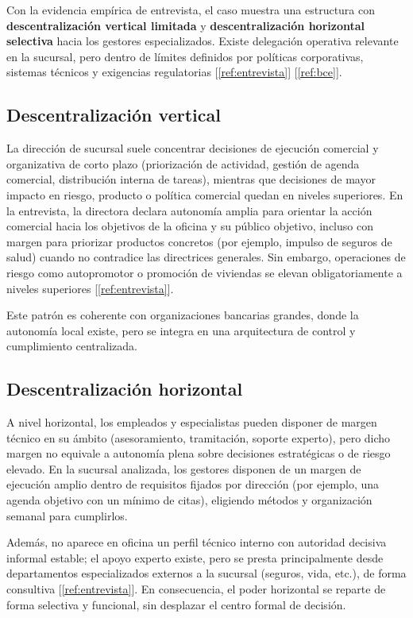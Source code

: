 Con la evidencia empírica de entrevista, el caso muestra una estructura con
\textbf{descentralización vertical limitada} y \textbf{descentralización horizontal
selectiva} hacia los gestores especializados. Existe delegación operativa relevante
en la sucursal, pero dentro de límites definidos por políticas corporativas, sistemas
técnicos y exigencias regulatorias [\ref{ref:entrevista}] [\ref{ref:bce}].

\subsection*{Descentralización vertical}

La dirección de sucursal suele concentrar decisiones de ejecución comercial y
organizativa de corto plazo (priorización de actividad, gestión de agenda
comercial, distribución interna de tareas), mientras que decisiones de mayor impacto
en riesgo, producto o política comercial quedan en niveles superiores. En la
entrevista, la directora declara autonomía amplia para orientar la acción comercial
hacia los objetivos de la oficina y su público objetivo, incluso con margen para
priorizar productos concretos (por ejemplo, impulso de seguros de salud) cuando no
contradice las directrices generales. Sin embargo, operaciones de riesgo como
autopromotor o promoción de viviendas se elevan obligatoriamente a niveles
superiores [\ref{ref:entrevista}].

Este patrón es coherente con organizaciones bancarias grandes, donde la autonomía
local existe, pero se integra en una arquitectura de control y cumplimiento
centralizada.

\subsection*{Descentralización horizontal}

A nivel horizontal, los empleados y especialistas pueden disponer de margen técnico
en su ámbito (asesoramiento, tramitación, soporte experto), pero dicho margen no
equivale a autonomía plena sobre decisiones estratégicas o de riesgo elevado. En
la sucursal analizada, los gestores disponen de un margen de ejecución amplio dentro
de requisitos fijados por dirección (por ejemplo, una agenda objetivo con un mínimo
de citas), eligiendo métodos y organización semanal para cumplirlos.

Además, no aparece en oficina un perfil técnico interno con autoridad decisiva
informal estable; el apoyo experto existe, pero se presta principalmente desde
departamentos especializados externos a la sucursal (seguros, vida, etc.), de forma
consultiva [\ref{ref:entrevista}]. En consecuencia, el poder horizontal se reparte
de forma selectiva y funcional, sin desplazar el centro formal de decisión.

